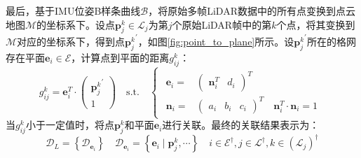 最后，基于IMU位姿B样条曲线$\mathcal{B}$，将原始多帧LiDAR数据中的所有点变换到点云地图$\mathcal{M}$的坐标系下。设点$\boldsymbol{p}_j^k\in\mathcal{L}_j$为第$j$个原始LiDAR帧中的第$k$个点，将其变换到$\mathcal{M}$对应的坐标系下，得到点${\boldsymbol{p}_j^k}^\prime$，如图\ref{fig:point_to_plane}所示。设${\boldsymbol{p}_j^k}^\prime$所在的格网存在平面$\boldsymbol{e}_i\in\mathcal{E}$，计算点到平面的距离$g_{ij}^k$：
\begin{equation}
  g_{ij}^k=\boldsymbol{e}_i^T\cdot\begin{pmatrix}
    {\boldsymbol{p}_j^k}^\prime \\1
  \end{pmatrix}
  \quad \mathrm{s.t.}\quad\begin{cases}
    \begin{aligned}
      \boldsymbol{e}_i= & \begin{pmatrix}
                            \boldsymbol{n}_i^T & d_i
                          \end{pmatrix}^T \\
      \boldsymbol{n}_i= & \begin{pmatrix}
                            a_i & b_i & c_i
                          \end{pmatrix}^T
      \quad \boldsymbol{n}_i^T\cdot\boldsymbol{n}_i=1
    \end{aligned}
  \end{cases}
\end{equation}
当$g_{ij}^k$小于一定值时，将点$\boldsymbol{p}_j^k$和平面$\boldsymbol{e}_i$进行关联。最终的关联结果表示为：
\begin{equation}
  \mathcal{D}_{L}=\left\lbrace\mathcal{D}_{\boldsymbol{e}_i} \right\rbrace\quad\mathcal{D}_{\boldsymbol{e}_i}=\left\lbrace \boldsymbol{e}_i\mid\boldsymbol{p}_j^k,\cdots\right\rbrace \quad i\in\mathcal{E}^\dagger
  ,j\in\mathcal{L}^\dagger,k\in(\mathcal{L}_j)^\dagger
\end{equation}

